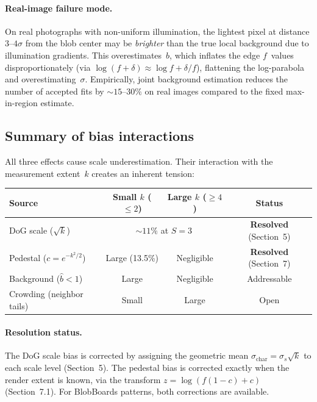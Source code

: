 \documentclass[11pt]{article}
\begin{document}
\paragraph{Real-image failure mode.}
On real photographs with non-uniform illumination, the lightest pixel
at distance $3$--$4\sigma$ from the blob center may be \emph{brighter}
than the true local background due to illumination gradients.  This
overestimates~$b$, which inflates the edge $f$~values
disproportionately (via $\log(f + \delta) \approx \log f + \delta/f$),
flattening the log-parabola and overestimating~$\sigma$.  Empirically,
joint background estimation reduces the number of accepted fits by
$\sim\!15$--$30\%$ on real images compared to the fixed max-in-region
estimate.

\subsection{Summary of bias interactions}

All three effects cause scale underestimation.  Their interaction with
the measurement extent~$k$ creates an inherent tension:
\begin{center}
\begin{tabular}{@{}lccc@{}}
\toprule
Source & Small $k$ ($\leq 2$) & Large $k$ ($\geq 4$) & Status \\
\midrule
DoG scale ($\sqrt{k}$)          & \multicolumn{2}{c}{$\sim\!11\%$ at $S=3$} & \textbf{Resolved} (Section~5) \\
Pedestal ($c = e^{-k^2/2}$)     & Large (13.5\%)  & Negligible & \textbf{Resolved} (Section~7) \\
Background ($\hat{b} < 1$)      & Large           & Negligible & Addressable \\
Crowding (neighbor tails)        & Small           & Large      & Open \\
\bottomrule
\end{tabular}
\end{center}

\paragraph{Resolution status.}
The DoG scale bias is corrected by assigning the geometric mean
$\sigma_{\mathrm{char}} = \sigma_s\sqrt{k}$ to each scale level
(Section~5).  The pedestal bias is corrected exactly when the render
extent is known, via the transform $z = \log(f(1-c)+c)$
(Section~7.1).  For BlobBoards patterns, both corrections are
available.
\end{document}
